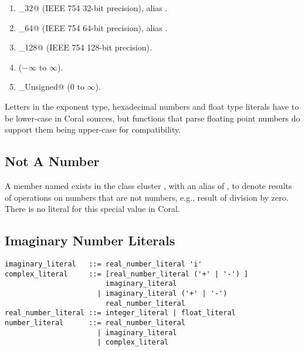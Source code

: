 \begin{enumerate}

  \item \lstinline@Float_32@ (IEEE 754 32-bit precision), alias \lstinline@Float@. 

  \item \lstinline@Float_64@ (IEEE 754 64-bit precision), alias \lstinline@Double@.

  \item \lstinline@Float_128@ (IEEE 754 128-bit precision).

  \item \lstinline@Decimal@ ($-\infty$ to $\infty$).

  \item \lstinline@Decimal_Unsigned@ ($0$ to $\infty$).

\end{enumerate}

Letters in the exponent type, hexadecimal numbers and float type literals have to be lower-case in Coral sources, but functions that parse floating point numbers do support them being upper-case for compatibility. 





\subsection{Not A Number}
\label{sec:nan}

A member named  exists in the class cluster , with an alias of , to denote results of operations on numbers that are not numbers, e.g., result of division by zero. There is no literal for this special value in Coral. 






\subsection{Imaginary Number Literals}
\label{sec:imaginaryliterals}

\syntax\begin{lstlisting}
imaginary_literal   ::= real_number_literal 'i'
complex_literal     ::= [real_number_literal ('+' | '-') ]
                        imaginary_literal
	                  | imaginary_literal ('+' | '-') 
	                    real_number_literal
real_number_literal ::= integer_literal | float_literal
number_literal      ::= real_number_literal
	                  | imaginary_literal
	                  | complex_literal
\end{lstlisting}

